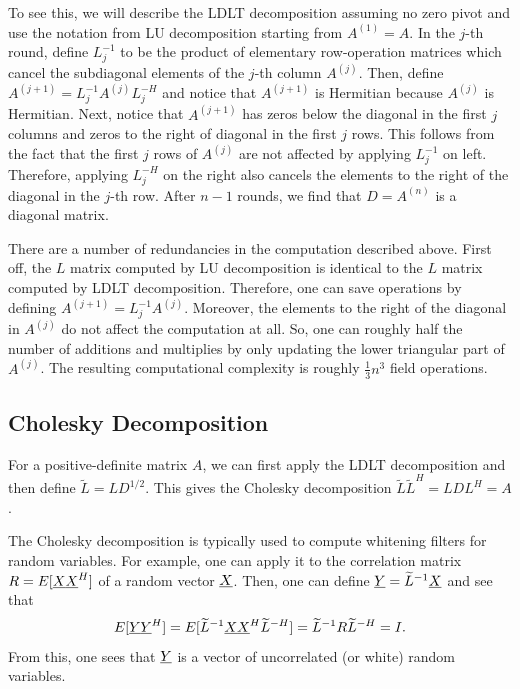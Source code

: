  
To see this, we will describe the LDLT decomposition assuming no zero pivot and use the notation from LU decomposition starting from $A^{(1)} = A$.
In the $j$-th round, define $L_j^{-1}$ to be the product of elementary row-operation matrices which cancel the subdiagonal elements of the $j$-th column $A^{(j)}$.
Then, define $A^{(j+1)} = L_j^{-1} A^{(j)} L_j^{-H}$ and notice that $A^{(j+1)}$ is Hermitian because $A^{(j)}$ is Hermitian.
Next, notice that $A^{(j+1)}$ has zeros below the diagonal in the first $j$ columns and zeros to the right of diagonal in the first $j$ rows.
This follows from the fact that the first $j$ rows of $A^{(j)}$ are not affected by applying $L_j^{-1}$ on left.
Therefore, applying $L_j^{-H}$ on the right also cancels the elements to the right of the diagonal in the $j$-th row.
After $n-1$ rounds, we find that $D = A^{(n)}$ is a diagonal matrix.

There are a number of redundancies in the computation described above.
First off, the $L$ matrix computed by LU decomposition is identical to the $L$ matrix computed by LDLT decomposition.
Therefore, one can save operations by defining $A^{(j+1)} = L_j^{-1} A^{(j)}$.
Moreover, the elements to the right of the diagonal in $A^{(j)}$ do not affect the computation at all.
So, one can roughly half the number of additions and multiplies by only updating the lower triangular part of $A^{(j)}$.
The resulting computational complexity is roughly $\frac{1}{3}n^3$ field operations.

\subsection{Cholesky Decomposition}

For a positive-definite matrix $A$, we can first apply the LDLT decomposition and then define $\widetilde{L} = L D^{1/2}$.
This gives the Cholesky decomposition $\widetilde{L} \widetilde{L}^H = L D L^H = A$.

The Cholesky decomposition is typically used to compute whitening filters for random variables.
For example, one can apply it to the correlation matrix $R = E [ \underline{X} \underline{X}^H ]$ of a random vector $\underline{X}$.
Then, one can define $\underline{Y} = \widetilde{L}^{-1} \underline{X}$ and see that
\[ E [ \underline{Y} \underline{Y}^H ] =  E [ \widetilde{L}^{-1} \underline{X} \underline{X}^H \widetilde{L}^{-H}] = \widetilde{L}^{-1} R \widetilde{L}^{-H} = I. \]
From this, one sees that $\underline{Y}$ is a vector of uncorrelated (or white) random variables.

